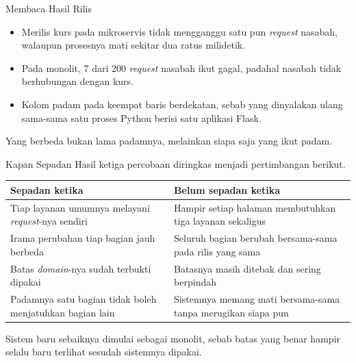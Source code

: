 \documentclass[aspectratio=169, table, 12pt]{beamer}
\begin{document}
\begin{frame}{{\Large Membaca Hasil Rilis}}
  \vspace{10pt}
  \begin{itemize}\small
    \item Merilis kurs pada mikroservis tidak mengganggu satu pun
          \textit{request} nasabah, walaupun prosesnya mati sekitar dua ratus
          milidetik.
    \item Pada monolit, 7 dari 200 \textit{request} nasabah ikut gagal, padahal
          nasabah tidak berhubungan dengan kurs.
    \item Kolom padam pada keempat baris berdekatan, sebab yang dinyalakan
          ulang sama-sama satu proses Python berisi satu aplikasi Flask.
  \end{itemize}

  \vspace{8pt}
  {\small Yang berbeda bukan lama padamnya, melainkan siapa saja yang ikut
  padam.}
\end{frame}

\begin{frame}{{\Large Kapan Sepadan}}
  \vspace{10pt}
  {\small Hasil ketiga percobaan diringkas menjadi pertimbangan berikut.}

  \vspace{4pt}
  \centering
  \scriptsize
  \begin{tabularx}{0.96\textwidth}{|>{\raggedright\arraybackslash}X|>{\raggedright\arraybackslash}X|}
    \hline
    \textbf{Sepadan ketika} & \textbf{Belum sepadan ketika} \\
    \hline
    Tiap layanan umumnya melayani \textit{request}-nya sendiri & Hampir setiap halaman membutuhkan tiga layanan sekaligus \\
    \hline
    Irama perubahan tiap bagian jauh berbeda & Seluruh bagian berubah bersama-sama pada rilis yang sama \\
    \hline
    Batas \textit{domain}-nya sudah terbukti dipakai & Batasnya masih ditebak dan sering berpindah \\
    \hline
    Padamnya satu bagian tidak boleh menjatuhkan bagian lain & Sistemnya memang mati bersama-sama tanpa merugikan siapa pun \\
    \hline
  \end{tabularx}

  \vspace{6pt}
  \raggedright
  {\small Sistem baru sebaiknya dimulai sebagai monolit, sebab batas yang benar
  hampir selalu baru terlihat sesudah sistemnya dipakai.}
\end{frame}
\end{document}
